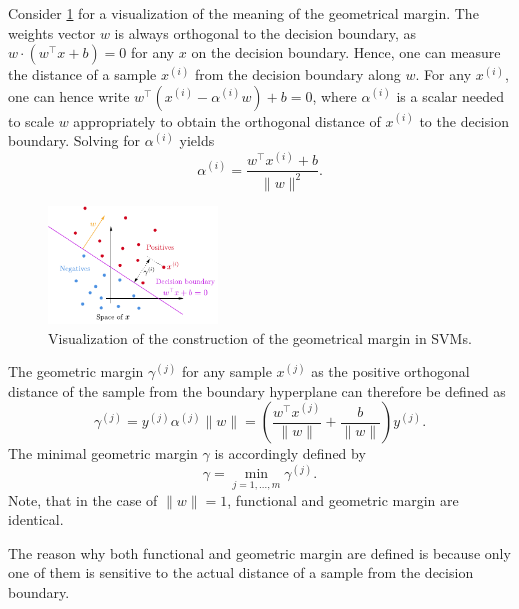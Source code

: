 \documentclass[a4paper,11pt]{article}
\numberwithin{equation}{section}
\begin{document}
{	Consider \cref{fig:geometrical_margin} for a visualization of the meaning of the geometrical margin. The weights vector $w$ is always orthogonal to the decision boundary, as $w\cdot \left(w^\top x + b\right) = 0$ for any $x$ on the decision boundary. Hence, one can measure the distance of a sample $x^{(i)}$ from the decision boundary along $w$. For any $x^{(i)}$, one can hence write $w^\top \left(x^{(i)} - \alpha^{(i)}w\right) + b = 0$, where $\alpha^{(i)}$ is a scalar needed to scale $w$ appropriately to obtain the orthogonal distance of $x^{(i)}$ to the decision boundary. Solving for $\alpha^{(i)}$ yields \begin{equation}
		\alpha^{(i)} = \frac{w^\top x^{(i)}+ b}{\|w\|^2}.
	\end{equation}
	\begin{figure}[h]
		\centering
		\includegraphics[width=0.4\textwidth]{figures/geometrical_margin.pdf}
		\caption{Visualization of the construction of the geometrical margin in SVMs.}
		\label{fig:geometrical_margin}
	\end{figure} The geometric margin $\gamma^{(j)}$ for any sample $x^{(j)}$ as the positive orthogonal distance of the sample from the boundary hyperplane can therefore be defined as \begin{equation}
	\gamma^{(j)} = y^{(j)}\alpha^{(j)}\|w\| = \left(\frac{w^\top x^{(j)}}{\|w\|}+\frac{b}{\|w\|}\right)y^{(j)}.
	\end{equation} The minimal geometric margin $\gamma$ is accordingly defined by \begin{equation}
	\gamma = \min_{j=1,\dots,m} \gamma^{(j)}.
	\end{equation} Note, that in the case of $\|w\| = 1$, functional and geometric margin are identical.
	
	The reason why both functional and geometric margin are defined is because only one of them is sensitive to the actual distance of a sample from the decision boundary.
}
\end{document}
